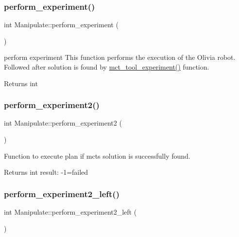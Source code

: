 \subsubsection{\texorpdfstring{perform\+\_\+experiment()}{perform\_experiment()}}
{\footnotesize\ttfamily int Manipulate\+::perform\+\_\+experiment (\begin{DoxyParamCaption}{ }\end{DoxyParamCaption})\hspace{0.3cm}{\ttfamily [private]}}



perform experiment This function performs the execution of the Olivia robot. Followed after solution is found by \hyperlink{structManipulate_a0ccd3cd41e0cb39485fe962393e69efd}{mct\+\_\+tool\+\_\+experiment()} function. 

\begin{DoxyReturn}{Returns}
int 
\end{DoxyReturn}
\mbox{\label{structManipulate_aabfbcf8aba7c38776bc37db8d01508d6}} 
\subsubsection{\texorpdfstring{perform\+\_\+experiment2()}{perform\_experiment2()}}
{\footnotesize\ttfamily int Manipulate\+::perform\+\_\+experiment2 (\begin{DoxyParamCaption}{ }\end{DoxyParamCaption})\hspace{0.3cm}{\ttfamily [private]}}



Function to execute plan if mcts solution is successfully found. 

\begin{DoxyReturn}{Returns}
int result\+: -\/1=failed 
\end{DoxyReturn}
\mbox{\label{structManipulate_aa5bc40657d99cd3c92804a61925327cc}} 
\subsubsection{\texorpdfstring{perform\+\_\+experiment2\+\_\+left()}{perform\_experiment2\_left()}}
{\footnotesize\ttfamily int Manipulate\+::perform\+\_\+experiment2\+\_\+left (\begin{DoxyParamCaption}{ }\end{DoxyParamCaption})\hspace{0.3cm}{\ttfamily [private]}}




